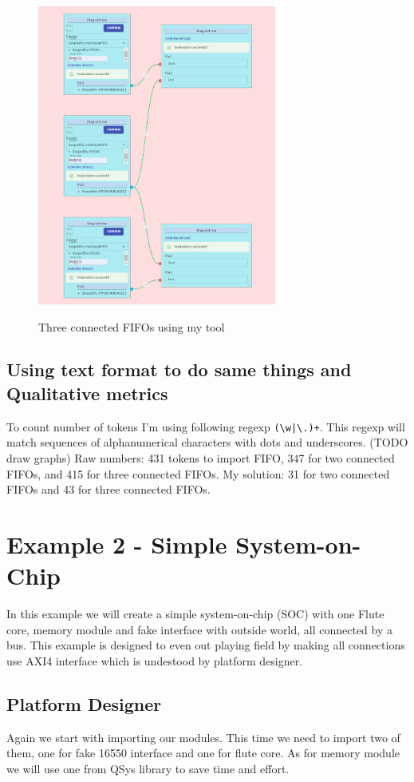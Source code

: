 \documentclass[14pt]{report}
\begin{document}
\begin{figure}
    \caption{Three connected FIFOs using my tool}
    \includegraphics[width=0.7\textwidth]{images/Example1MySolution.png} \\
    \centering
\end{figure}

\subsection{Using text format to do same things and Qualitative metrics}
To count number of tokens I'm using following regexp \verb!(\w|\.)+!. This regexp will match sequences of alphanumerical characters with dots and underscores. (TODO draw graphs)
Raw numbers: 431 tokens to import FIFO, 347 for two connected FIFOs, and 415 for three connected FIFOs.
My solution: 31 for two connected FIFOs and 43 for three connected FIFOs.

\section{Example 2 - Simple System-on-Chip}
In this example we will create a simple system-on-chip (SOC) with one Flute core, memory module and fake interface with outside world, all connected by a bus. This example is designed to even out playing field by making all connections use AXI4 interface which is undestood by platform designer.

\subsection{Platform Designer}
Again we start with importing our modules. 
This time we need to import two of them, one for fake 16550 interface and one for flute core. 
As for memory module we will use one from QSys library to save time and effort.
\end{document}
